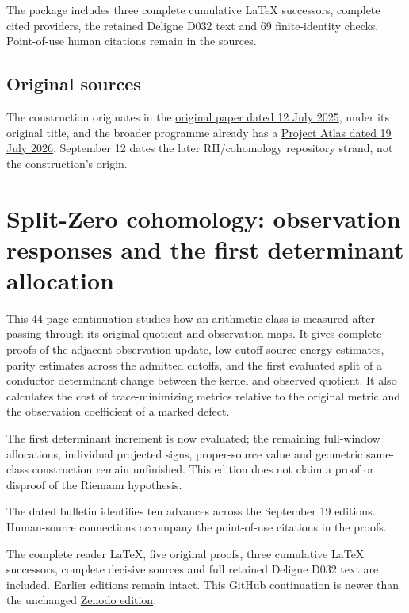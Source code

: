 \documentclass[
]{article}
\begin{document}
The package includes three complete cumulative LaTeX successors,
complete cited providers, the retained Deligne D032 text and 69
finite-identity checks. Point-of-use human citations remain in the
sources.

\subsection{Original sources}\label{original-sources}

The construction originates in the
\href{https://zenodo.org/records/17555345}{original paper dated 12 July
2025}, under its original title, and the broader programme already has a
\href{https://zenodo.org/records/21443852}{Project Atlas dated 19 July
2026}. September 12 dates the later RH/cohomology repository strand, not
the construction's origin.

\section{Split-Zero cohomology: observation responses and the first
determinant
allocation}\label{split-zero-cohomology-observation-responses-and-the-first-determinant-allocation}

This 44-page continuation studies how an arithmetic class is measured
after passing through its original quotient and observation maps. It
gives complete proofs of the adjacent observation update, low-cutoff
source-energy estimates, parity estimates across the admitted cutoffs,
and the first evaluated split of a conductor determinant change between
the kernel and observed quotient. It also calculates the cost of
trace-minimizing metrics relative to the original metric and the
observation coefficient of a marked defect.

The first determinant increment is now evaluated; the remaining
full-window allocations, individual projected signs, proper-source value
and geometric same-class construction remain unfinished. This edition
does not claim a proof or disproof of the Riemann hypothesis.

The dated bulletin identifies ten advances across the September 19
editions. Human-source connections accompany the point-of-use citations
in the proofs.

The complete reader LaTeX, five original proofs, three cumulative LaTeX
successors, complete decisive sources and full retained Deligne D032
text are included. Earlier editions remain intact. This GitHub
continuation is newer than the unchanged
\href{https://doi.org/10.5281/zenodo.22821108}{Zenodo edition}.
\end{document}

